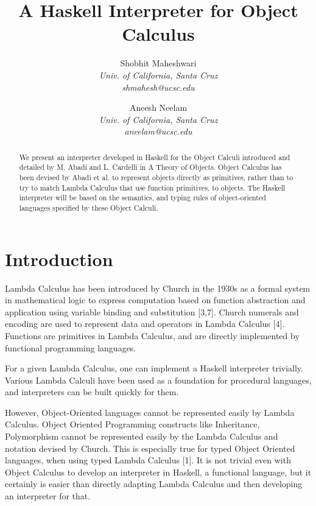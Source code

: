 \documentclass[10pt,twocolumn]{article}
\begin{document}
\title{A Haskell Interpreter for Object Calculus}

\author{
Shobhit Maheshwari \\
\textit{Univ. of California, Santa Cruz} \\
\textit{shmahesh@ucsc.edu}
\and
Aneesh Neelam \\
\textit{Univ. of California, Santa Cruz} \\
\textit{aneelam@ucsc.edu}
}

\maketitle
\thispagestyle{empty}

\begin{abstract}
We present an interpreter developed in Haskell for the Object Calculi introduced and detailed by M. Abadi and L. Cardelli in A Theory of Objects.  Object Calculus has been devised by Abadi et al. to represent objects directly as primitives, rather than to try to match Lambda Calculus that use function primitives, to objects. The Haskell interpreter will be based on the semantics, and typing rules of object-oriented languages specified by these Object Calculi. 
\end{abstract}

\section{Introduction}

Lambda Calculus has been introduced by Church in the 1930s as a formal system in mathematical logic to express computation based on function abstraction and application using variable binding and substitution [3,7]. Church numerals and encoding are used to represent data and operators in Lambda Calculus [4]. Functions are primitives in Lambda Calculus, and are directly implemented by functional programming languages. 

For a given Lambda Calculus, one can implement a Haskell interpreter trivially. Various Lambda Calculi have been used as a foundation for procedural languages, and interpreters can be built quickly for them. 

However, Object-Oriented languages cannot be represented easily by Lambda Calculus. Object Oriented Programming constructs like Inheritance, Polymorphism cannot be represented easily by the Lambda Calculus and notation devised by Church. This is especially true for typed Object Oriented languages, when using typed Lambda Calculus [1]. It is not trivial even with Object Calculus to develop an interpreter in Haskell, a functional language, but it certainly is easier than directly adapting Lambda Calculus and then developing an interpreter for that. 
\end{document}
